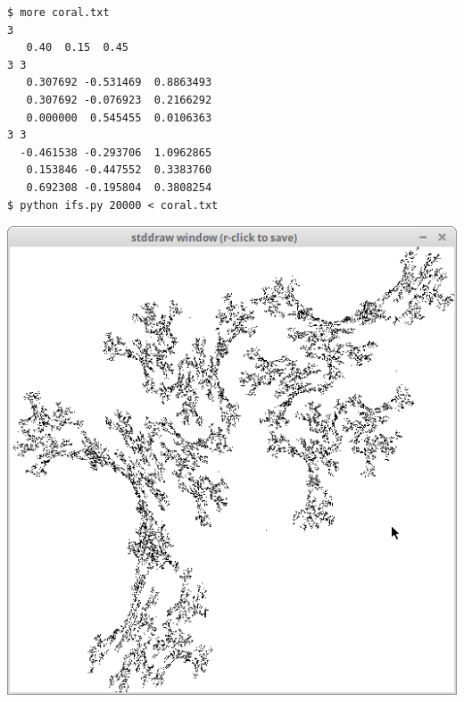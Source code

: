 \documentclass[8pt,a4paper,compress,handout]{beamer}
\begin{document}
\begin{frame}[fragile]
\begin{minipage}{160pt}
\begin{lstlisting}[language={}]
$ more coral.txt
3
   0.40  0.15  0.45 
3 3
   0.307692 -0.531469  0.8863493
   0.307692 -0.076923  0.2166292
   0.000000  0.545455  0.0106363
3 3
  -0.461538 -0.293706  1.0962865
   0.153846 -0.447552  0.3383760
   0.692308 -0.195804  0.3808254
$ python ifs.py 20000 < coral.txt
\end{lstlisting}
\end{minipage}%
\begin{minipage}{140pt}
\hfill \includegraphics[scale=0.17]{figures/coral.png}
\end{minipage}
\end{frame}
\end{document}
